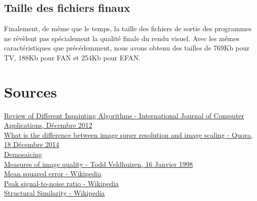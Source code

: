 \documentclass[]{article}
\begin{document}
\hypertarget{taille-des-fichiers-finaux}{%
\subsection{Taille des fichiers
finaux}\label{taille-des-fichiers-finaux}}

Finalement, de même que le temps, la taille des fichiers de sortie des
programmes ne révèlent pas spécialement la qualité finale du rendu
visuel. Avec les mêmes caractéristiques que précédemment, nous avons
obtenu des tailles de 769Kb pour TV, 188Kb pour FAN et 254Kb pour EFAN.

\newpage

\hypertarget{sources}{%
\section{Sources}\label{sources}}

\href{http://citeseerx.ist.psu.edu/viewdoc/download?doi=10.1.1.303.5459\&rep=rep1\&type=pdf}{Review
of Different Inpainting Algorithms - International Journal of Computer
Applications, Décembre 2012}\\
\href{https://www.quora.com/What-is-the-difference-between-image-superresolution-and-image-scaling}{What
is the difference between image super resolution and image scaling -
Quora, 18 Décembre 2014}\\
\href{https://ngi-user-guide.readthedocs.io/en/latest/demosaicing/}{Demosaicing}\\
\href{http://homepages.inf.ed.ac.uk/rbf/CVonline/LOCAL_COPIES/VELDHUIZEN/node18.html}{Measures
of image quality - Todd Veldhuizen, 16 Janvier 1998}\\
\href{https://en.wikipedia.org/wiki/Mean_squared_error}{Mean squared
error - Wikipedia}\\
\href{https://en.wikipedia.org/wiki/Peak_signal-to-noise_ratio}{Peak
signal-to-noise ratio - Wikipedia}\\
\href{https://en.wikipedia.org/wiki/Structural_similarity}{Structural
Similarity - Wikipedia}
\end{document}
